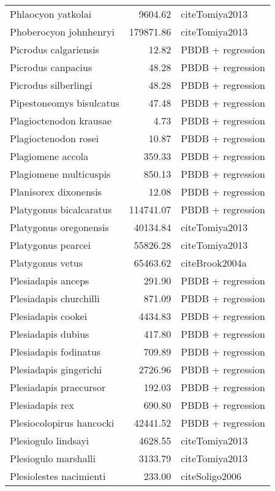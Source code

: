 \begin{table}[ht]
\begin{tabular}{lrl}
  Phlaocyon yatkolai & 9604.62 & cite{Tomiya2013} \\ 
  Phoberocyon johnhenryi & 179871.86 & cite{Tomiya2013} \\ 
  Picrodus calgariensis & 12.82 & PBDB + regression \\ 
  Picrodus canpacius & 48.28 & PBDB + regression \\ 
  Picrodus silberlingi & 48.28 & PBDB + regression \\ 
  Pipestoneomys bisulcatus & 47.48 & PBDB + regression \\ 
  Plagioctenodon krausae & 4.73 & PBDB + regression \\ 
  Plagioctenodon rosei & 10.87 & PBDB + regression \\ 
  Plagiomene accola & 359.33 & PBDB + regression \\ 
  Plagiomene multicuspis & 850.13 & PBDB + regression \\ 
  Planisorex dixonensis & 12.08 & PBDB + regression \\ 
  Platygonus bicalcaratus & 114741.07 & PBDB + regression \\ 
  Platygonus oregonensis & 40134.84 & cite{Tomiya2013} \\ 
  Platygonus pearcei & 55826.28 & cite{Tomiya2013} \\ 
  Platygonus vetus & 65463.62 & cite{Brook2004a} \\ 
  Plesiadapis anceps & 291.90 & PBDB + regression \\ 
  Plesiadapis churchilli & 871.09 & PBDB + regression \\ 
  Plesiadapis cookei & 4434.83 & PBDB + regression \\ 
  Plesiadapis dubius & 417.80 & PBDB + regression \\ 
  Plesiadapis fodinatus & 709.89 & PBDB + regression \\ 
  Plesiadapis gingerichi & 2726.96 & PBDB + regression \\ 
  Plesiadapis praecursor & 192.03 & PBDB + regression \\ 
  Plesiadapis rex & 690.80 & PBDB + regression \\ 
  Plesiocolopirus hancocki & 42441.52 & PBDB + regression \\ 
  Plesiogulo lindsayi & 4628.55 & cite{Tomiya2013} \\ 
  Plesiogulo marshalli & 3133.79 & cite{Tomiya2013} \\ 
  Plesiolestes nacimienti & 233.00 & cite{Soligo2006} \\ 

\end{tabular}
\end{table}
